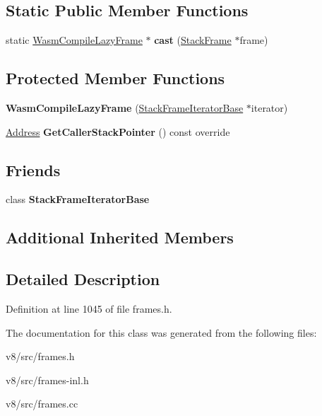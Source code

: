 \subsection*{Static Public Member Functions}
\begin{DoxyCompactItemize}
\item 
\mbox{\label{classv8_1_1internal_1_1WasmCompileLazyFrame_a440db83e4fe3ee2c37f2eca54cc4bb59}} 
static \mbox{\hyperlink{classv8_1_1internal_1_1WasmCompileLazyFrame}{Wasm\+Compile\+Lazy\+Frame}} $\ast$ {\bfseries cast} (\mbox{\hyperlink{classv8_1_1internal_1_1StackFrame}{Stack\+Frame}} $\ast$frame)
\end{DoxyCompactItemize}
\subsection*{Protected Member Functions}
\begin{DoxyCompactItemize}
\item 
\mbox{\label{classv8_1_1internal_1_1WasmCompileLazyFrame_a4e90506adb4a7fa05903d3b18ce58c6a}} 
{\bfseries Wasm\+Compile\+Lazy\+Frame} (\mbox{\hyperlink{classv8_1_1internal_1_1StackFrameIteratorBase}{Stack\+Frame\+Iterator\+Base}} $\ast$iterator)
\item 
\mbox{\label{classv8_1_1internal_1_1WasmCompileLazyFrame_a02f7c19245dc591efeaafd3f6fc3616a}} 
\mbox{\hyperlink{classuintptr__t}{Address}} {\bfseries Get\+Caller\+Stack\+Pointer} () const override
\end{DoxyCompactItemize}
\subsection*{Friends}
\begin{DoxyCompactItemize}
\item 
\mbox{\label{classv8_1_1internal_1_1WasmCompileLazyFrame_ac7310421866976ca454bbe11c5f926c3}} 
class {\bfseries Stack\+Frame\+Iterator\+Base}
\end{DoxyCompactItemize}
\subsection*{Additional Inherited Members}


\subsection{Detailed Description}


Definition at line 1045 of file frames.\+h.



The documentation for this class was generated from the following files\+:\begin{DoxyCompactItemize}
\item 
v8/src/frames.\+h\item 
v8/src/frames-\/inl.\+h\item 
v8/src/frames.\+cc\end{DoxyCompactItemize}
